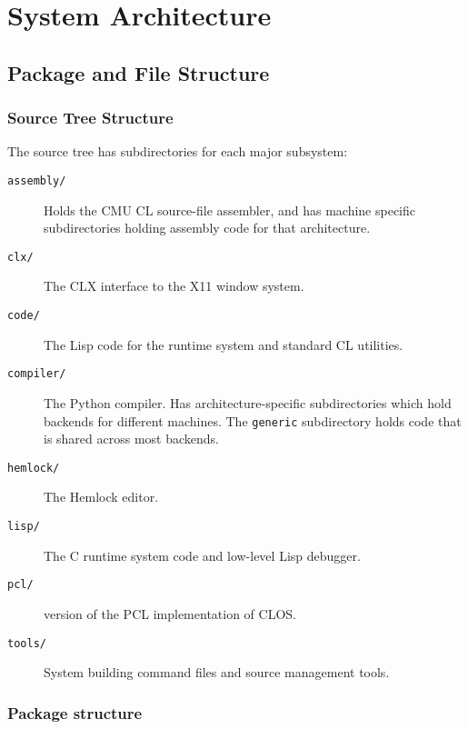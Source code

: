 \part{System Architecture}%

\chapter{Package and File Structure}

\section{Source Tree Structure}

The \cmucl{} source tree has subdirectories for each major subsystem:

\begin{description}
\item[{\tt assembly/}] Holds the CMU CL source-file assembler, and has machine
specific subdirectories holding assembly code for that architecture.

\item[{\tt clx/}] The CLX interface to the X11 window system.

\item[{\tt code/}] The Lisp code for the runtime system and standard CL
utilities.

\item[{\tt compiler/}] The Python compiler.  Has architecture-specific
subdirectories which hold backends for different machines.  The {\tt generic}
subdirectory holds code that is shared across most backends.

\item[{\tt hemlock/}] The Hemlock editor.

\item[{\tt lisp/}] The C runtime system code and low-level Lisp debugger.

\item[{\tt pcl/}] \cmucl{} version of the PCL implementation of CLOS.

\item[{\tt tools/}] System building command files and source management tools.
\end{description}


\section{Package structure}

